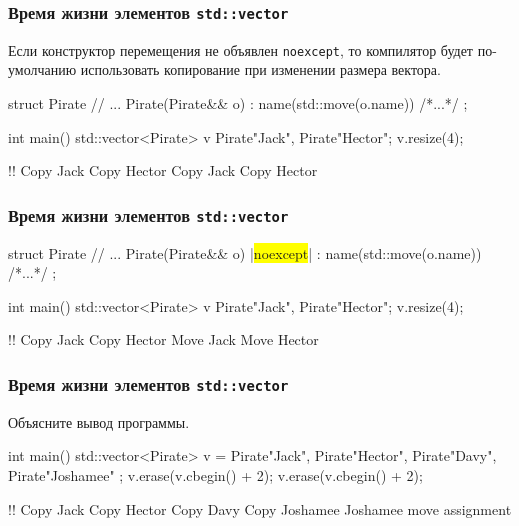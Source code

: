 \documentclass[compress, 8pt]{beamer}
\begin{document}
  \begin{frame}[fragile]

    \frametitle{Время жизни элементов \texttt{std::vector}}

    Если конструктор перемещения не объявлен \texttt{noexcept},
    то компилятор будет по-умолчанию использовать копирование
    при изменении размера вектора.

    \begin{mycppinplacelisting}
struct Pirate {
    // ...
    Pirate(Pirate&& o) : name(std::move(o.name)) {/*...*/}
};

int main() {
    std::vector<Pirate> v {Pirate{"Jack"}, Pirate{"Hector"}};
    v.resize(4);
}
    \end{mycppinplacelisting}

    \begin{terminalwindow}
!!
Copy Jack
Copy Hector
Copy Jack
Copy Hector
    \end{terminalwindow}

  \end{frame}

  \begin{frame}[fragile]

    \frametitle{Время жизни элементов \texttt{std::vector}}

    \begin{mycppinplacelisting}
struct Pirate {
    // ...
    Pirate(Pirate&& o) |\colorbox{yellow}{noexcept}| : name(std::move(o.name))
    {/*...*/}
};

int main() {
    std::vector<Pirate> v {Pirate{"Jack"}, Pirate{"Hector"}};
    v.resize(4);
}
    \end{mycppinplacelisting}

    \begin{terminalwindow}
!!
Copy Jack
Copy Hector
Move Jack
Move Hector
    \end{terminalwindow}

  \end{frame}

  \begin{frame}[fragile]

    \frametitle{Время жизни элементов \texttt{std::vector}}

    \begin{task}
      Объясните вывод программы.
    \end{task}

    \begin{mycppinplacelisting}
int main() {
    std::vector<Pirate> v = {
        Pirate{"Jack"}, Pirate{"Hector"},
        Pirate{"Davy"}, Pirate{"Joshamee"}
    };
    v.erase(v.cbegin() + 2);
    v.erase(v.cbegin() + 2);
}
    \end{mycppinplacelisting}

    \begin{terminalwindow}
!!
Copy Jack
Copy Hector
Copy Davy
Copy Joshamee
Joshamee move assignment
    \end{terminalwindow}

  \end{frame}
\end{document}
